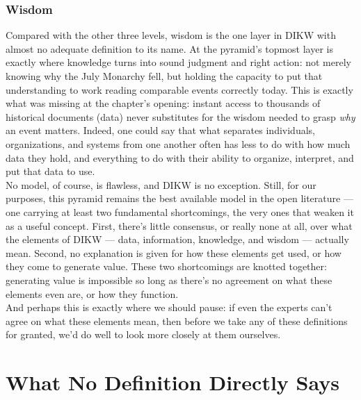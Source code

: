 \subsubsection{Wisdom}
Compared with the other three levels, wisdom is the one layer in DIKW with almost no adequate definition to its name. At the pyramid's topmost layer is exactly where knowledge turns into sound judgment and right action: not merely knowing why the July Monarchy fell, but holding the capacity to put that understanding to work reading comparable events correctly today. This is exactly what was missing at the chapter's opening: instant access to thousands of historical documents (data) never substitutes for the wisdom needed to grasp \emph{why} an event matters. Indeed, one could say that what separates individuals, organizations, and systems from one another often has less to do with how much data they hold, and everything to do with their ability to organize, interpret, and put that data to use.\\
No model, of course, is flawless, and DIKW is no exception. Still, for our purposes, this pyramid remains the best available model in the open literature --- one carrying at least two fundamental shortcomings, the very ones that weaken it as a useful concept. First, there's little consensus, or really none at all, over what the elements of DIKW --- data, information, knowledge, and wisdom --- actually mean. Second, no explanation is given for how these elements get used, or how they come to generate value. These two shortcomings are knotted together: generating value is impossible so long as there's no agreement on what these elements even are, or how they function.\\
And perhaps this is exactly where we should pause: if even the experts can't agree on what these elements mean, then before we take any of these definitions for granted, we'd do well to look more closely at them ourselves.
\newpage
\section{What No Definition Directly Says}
\label{sec:what-no-definition-says}

